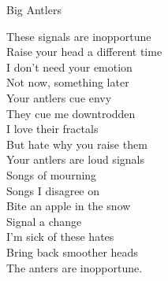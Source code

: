 Big Antlers

These signals are inopportune\\
Raise your head a different time\\
I don't need your emotion\\
Not now, something later\\

Your antlers cue envy\\
They cue me downtrodden\\
I love their fractals\\
But hate why you raise them\\

Your antlers are loud signals\\
Songs of mourning\\
Songs I disagree on\\
Bite an apple in the snow\\

Signal a change\\
I'm sick of these hates\\
Bring back smoother heads\\
The anters are inopportune.\\

